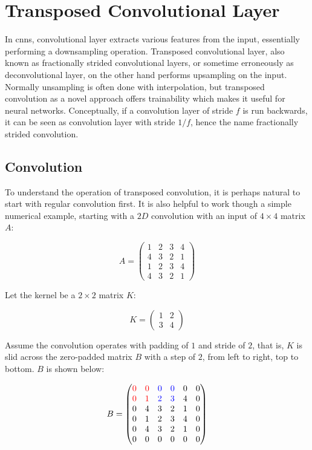 \section{Transposed Convolutional Layer}

In \gls{cnn}s, convolutional layer extracts various features from the input, essentially performing a
downsampling operation. Transposed convolutional layer, also known as fractionally strided convolutional
layers, or sometime erroneously as deconvolutional layer, on the other hand performs upsampling on the input.
Normally unsampling is often done with interpolation, but transposed convolution as a novel approach offers
trainability which makes it useful for neural networks. Conceptually, if a convolution layer of stride $f$
is run backwards, it can be seen as convolution layer with stride $1/f$, hence the name fractionally
strided convolution.

\subsection{Convolution}

To understand the operation of transposed convolution, it is perhaps natural to start with regular convolution
first. It is also helpful to work though a simple numerical example, starting with a $2D$ convolution
with an input of $4 \times 4$ matrix $A$:

$$
A =
  \begin{pmatrix}
    1 & 2 & 3 & 4 \\
    4 & 3 & 2 & 1 \\
    1 & 2 & 3 & 4 \\
    4 & 3 & 2 & 1
  \end{pmatrix}
$$

Let the kernel be a $2 \times 2$ matrix $K$:

$$
K =
  \begin{pmatrix}
    1 & 2 \\
    3 & 4
  \end{pmatrix}
$$

Assume the convolution operates with padding of $1$ and stride of $2$, that is, $K$ is slid across the
zero-padded matrix $B$ with a step of $2$, from left to right, top to bottom. $B$ is shown below:

$$
B =
  \begin{pmatrix}
    {\color{red}0} & {\color{red}0} & {\color{blue}0} & {\color{blue}0} & 0 & 0 \\
    {\color{red}0} & {\color{red}1} & {\color{blue}2} & {\color{blue}3} & 4 & 0 \\
    0 & 4 & 3 & 2 & 1 & 0 \\
    0 & 1 & 2 & 3 & 4 & 0 \\
    0 & 4 & 3 & 2 & 1 & 0 \\
    0 & 0 & 0 & 0 & 0 & 0
  \end{pmatrix}
$$

